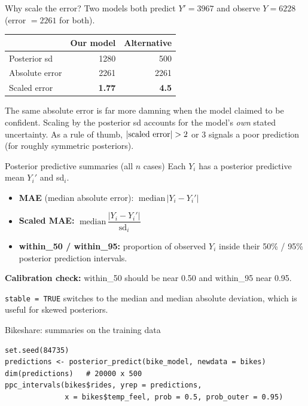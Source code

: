 \documentclass[aspectratio=43,11pt]{beamer}
\begin{document}
{\begin{frame}{Why scale the error?}
  Two models both predict $Y'=3967$ and observe $Y=6228$ (error $=2261$ for both).
  \begin{center}
  \begin{tabular}{lrr}
    \toprule
     & Our model & Alternative\\
    \midrule
    Posterior sd & 1280 & 500\\
    Absolute error & 2261 & 2261\\
    Scaled error & \textbf{1.77} & \textbf{4.5}\\
    \bottomrule
  \end{tabular}
  \end{center}
  \begin{alertblock}{}
    The same absolute error is far more damning when the model claimed to be confident. Scaling by the posterior sd accounts for the model's \emph{own} stated uncertainty. As a rule of thumb, $|{\rm scaled\ error}|>2$ or $3$ signals a poor prediction (for roughly symmetric posteriors).
  \end{alertblock}
\end{frame}

\begin{frame}{Posterior predictive summaries (all $n$ cases)}
  Each $Y_i$ has a posterior predictive mean $Y_i'$ and sd$_i$.
  \begin{itemize}
    \item \textbf{MAE} (median absolute error):
      $\;\text{median}\,|Y_i-Y_i'|$
    \item \textbf{Scaled MAE:}
      $\;\text{median}\,\dfrac{|Y_i-Y_i'|}{\text{sd}_i}$
    \item \textbf{within\_50 / within\_95:} proportion of observed $Y_i$ inside their 50\% / 95\% posterior prediction intervals.
  \end{itemize}
  \vspace{0.3em}
  \textbf{Calibration check:} within\_50 should be near 0.50 and within\_95 near 0.95.

  \medskip
  \texttt{stable = TRUE} switches to the median and median absolute deviation, which is useful for skewed posteriors.
\end{frame}

\begin{frame}[fragile]{Bikeshare: summaries on the training data}
\begin{lstlisting}
set.seed(84735)
predictions <- posterior_predict(bike_model, newdata = bikes)
dim(predictions)   # 20000 x 500
ppc_intervals(bikes$rides, yrep = predictions,
              x = bikes$temp_feel, prob = 0.5, prob_outer = 0.95)


\end{lstlisting}
\end{frame}}
\end{document}
